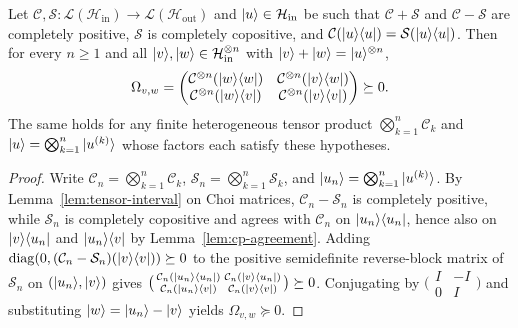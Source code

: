 \begin{theorem}
\label{thm:reverse-criterion}
\leanok
{}
Let $\mathcal{C}, \mathcal{S} : \mathcal{L}(\mathcal{H}_{\mathrm{in}}) \to \mathcal{L}(\mathcal{H}_{\mathrm{out}})$ and $|u\rangle\in\mathcal{H}_{\mathrm{in}}$ be such that $\mathcal{C}+\mathcal{S}$ and $\mathcal{C}-\mathcal{S}$ are completely positive, $\mathcal{S}$ is completely copositive, and $\mathcal{C}(|u\rangle\langle u|)=\mathcal{S}(|u\rangle\langle u|)$. Then for every $n\ge 1$ and all $|v\rangle,|w\rangle\in\mathcal{H}_{\mathrm{in}}^{\otimes n}$ with $|v\rangle+|w\rangle=|u\rangle^{\otimes n}$,
\[
  \Omega_{v,w} =
  \begin{pmatrix}
    \mathcal{C}^{\otimes n}(|w\rangle\langle w|) & \mathcal{C}^{\otimes n}(|v\rangle\langle w|) \\
    \mathcal{C}^{\otimes n}(|w\rangle\langle v|) & \mathcal{C}^{\otimes n}(|v\rangle\langle v|)
  \end{pmatrix}
  \succeq 0.
\]
The same holds for any finite heterogeneous tensor product $\bigotimes_{k=1}^n \mathcal{C}_k$ and $|u\rangle = \bigotimes_{k=1}^n |u^{(k)}\rangle$ whose factors each satisfy these hypotheses.
\end{theorem}
\begin{proof}
\leanok
Write $\mathcal{C}_n = \bigotimes_{k=1}^n \mathcal{C}_k$, $\mathcal{S}_n = \bigotimes_{k=1}^n \mathcal{S}_k$, and $|u_n\rangle = \bigotimes_{k=1}^n |u^{(k)}\rangle$. By Lemma~\ref{lem:tensor-interval} on Choi matrices, $\mathcal{C}_n - \mathcal{S}_n$ is completely positive, while $\mathcal{S}_n$ is completely copositive and agrees with $\mathcal{C}_n$ on $|u_n\rangle\langle u_n|$, hence also on $|v\rangle\langle u_n|$ and $|u_n\rangle\langle v|$ by Lemma~\ref{lem:cp-agreement}. Adding $\operatorname{diag}(0, (\mathcal{C}_n-\mathcal{S}_n)(|v\rangle\langle v|))\succeq 0$ to the positive semidefinite reverse-block matrix of $\mathcal{S}_n$ on $(|u_n\rangle,|v\rangle)$ gives $\bigl(\begin{smallmatrix}\mathcal{C}_n(|u_n\rangle\langle u_n|) & \mathcal{C}_n(|v\rangle\langle u_n|) \\ \mathcal{C}_n(|u_n\rangle\langle v|) & \mathcal{C}_n(|v\rangle\langle v|)\end{smallmatrix}\bigr)\succeq 0$. Conjugating by $\bigl(\begin{smallmatrix}I & -I \\ 0 & I\end{smallmatrix}\bigr)$ and substituting $|w\rangle=|u_n\rangle-|v\rangle$ yields $\Omega_{v,w}\succeq 0$.
\end{proof}

